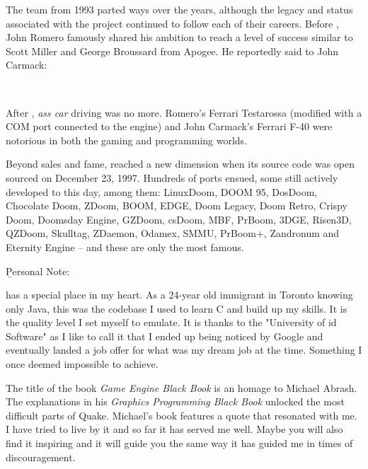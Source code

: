 The \doom{} team from 1993 parted ways over the years, although the legacy and status associated with the project continued to follow each of their careers. Before \doom{}, John Romero famously shared his ambition to reach a level of success similar to Scott Miller and George Broussard from Apogee. He reportedly said to John Carmack: \\
\par
 \\
 \par
After \doom{}, \textit{ass car} driving was no more. Romero's Ferrari Testarossa (modified with a COM port connected to the engine) and John Carmack's Ferrari F-40 were notorious in both the gaming and programming worlds.\\
\par
Beyond sales and fame, \doom{} reached a new dimension when its source code was open sourced on December 23, 1997. Hundreds of ports ensued, some still actively developed to this day, among them: LinuxDoom, DOOM 95, DosDoom, Chocolate Doom, ZDoom, BOOM, EDGE, Doom Legacy, Doom Retro, Crispy Doom, Doomsday Engine, GZDoom, csDoom, MBF, PrBoom, 3DGE, Risen3D, QZDoom, Skulltag, ZDaemon, Odamex, SMMU, PrBoom+, Zandronum and Eternity Engine -- and these are only the most famous.\\
\par
\vspace{10pt}
\b{Personal Note:}\\
\par
\doom{} has a special place in my heart. As a 24-year old immigrant in Toronto knowing only Java, this was the codebase I used to learn C and build up my skills. It is the quality level I set myself to emulate. It is thanks to the "University of id Software" as I like to call it that I ended up being noticed by Google and eventually landed a job offer for what was my dream job at the time. Something I once deemed impossible to achieve.\\
\par
The title of the book \textit{Game Engine Black Book} is an homage to Michael Abrash. The explanations in his \textit{Graphics Programming Black Book} unlocked the most difficult parts of Quake. Michael's book features a quote that resonated with me. I have tried to live by it and so far it has served me well. Maybe you will also find it inspiring and it will guide you the same way it has guided me in times of discouragement.\\
\par
{}

